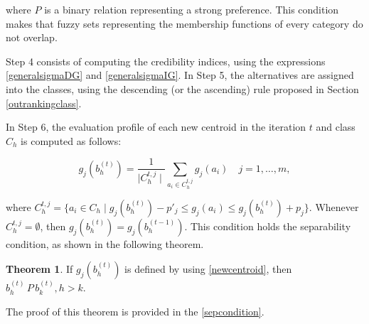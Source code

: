 \documentclass[]{elsarticle}
\theoremstyle{definition}
\newtheorem{prop}{Theorem}
\begin{document}
\noindent
where $P$ is a binary relation representing a strong preference.  This condition makes that fuzzy sets representing the membership functions of every category do not overlap. 


Step 4 consists of computing the credibility indices, using the expressions \eqref{generalsigmaDG} and  \eqref{generalsigmaIG}. In Step 5, the alternatives are assigned into the classes, using the descending (or the ascending) rule proposed in Section \ref{outrankingclass}.

In Step 6, the evaluation profile of each new centroid in the iteration $t$ and class $C_h$ is computed as follows:

\begin{equation}
g_j(b_h^{(t)}) = \frac{1}{\mid C_h^{t,j} \mid} \sum_{a_i \in C_h^{t,j}} g_j(a_i) \quad j=1,\ldots,m,\label{newcentroid}
\end{equation}

\noindent
where $C_h^{t,j}=\{a_i \in C_h \mid g_j(b_h^{(t)})-p'_j\leq g_j(a_i) \leq g_j(b_h^{(t)})+p_j\}$.  Whenever $C_h^{t,j}=\emptyset$, then $g_j(b_h^{(t)})=g_j(b_h^{(t-1)})$.   This condition holds the separability condition, as shown in the following theorem.

\begin{prop}
If  $g_j(b_h^{(t)})$ is defined by using \eqref{newcentroid}, then $b_h^{(t)} \,P\, b_k^{(t)}, h>k$.
\end{prop}

\noindent

The proof of this theorem is provided in the \ref{sepcondition}.
\end{document}
